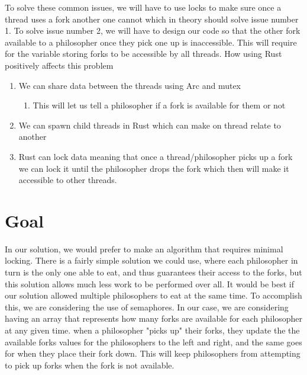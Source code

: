 \documentclass[conference]{IEEEtran}
\begin{document}
	 To solve these common issues, we will have to use locks to make sure once a thread uses a fork another one cannot which in theory should solve issue number 1. To solve issue number 2, we will have to design our code so that the other fork available to a philosopher once they pick one up is inaccessible. This will require for the variable storing forks to be accessible by all threads.
	 \linebreak
      \linebreak
	 How using Rust positively affects this problem
	 \begin{enumerate}
	 	\item We can share data between the threads using Arc and mutex
	 	\begin{enumerate}
	 		
	 		\item This will let us tell a philosopher if a fork is available for them or not
	 	\end{enumerate}
	 	\item We can spawn child threads in Rust which can make on thread relate to another
	 	\item Rust can lock data meaning that once a thread/philosopher picks up a fork we can lock it until the philosopher drops the fork which then will make it accessible to other threads.
	\end{enumerate}
	 \section{Goal}
		In our solution, we would prefer to make an algorithm that requires minimal locking. There is a fairly simple solution we could use, where each philosopher in turn is the only one able to eat, and thus guarantees their access to the forks, but this solution allows much less work to be performed over all. It would be best if our solution allowed multiple philosophers to eat at the same time. To accomplish this, we are considering the use of semaphores. In our case, we are considering having an array that represents how many forks are available for each philosopher at any given time. when a philosopher "picks up" their forks, they update the the available forks values for the philosophers to the left and right, and the same goes for when they place their fork down. This will keep philosophers from attempting to pick up forks when the fork is not available. 
	\linebreak
	
	
\end{document}
